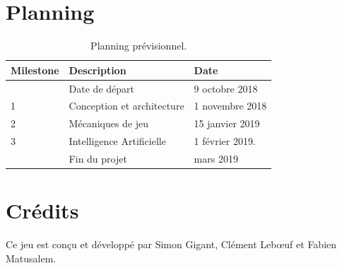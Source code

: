 \documentclass[a4paper]{scrreprt}
\begin{document}


\chapter{Planning}

\begin{table}[h]
\centering
\begin{tabular}{|l|l|l|}
\hline
Milestone & Description & Date \\\hline
& Date de départ & 9 octobre 2018 \\
1 & Conception et architecture  & 1 novembre 2018 \\
2 & Mécaniques de jeu & 15 janvier 2019\\
3 & Intelligence Artificielle & 1 février 2019. \\
& Fin du projet & mars 2019 \\
\hline
\end{tabular}
\caption{\label{tab:schedule}Planning prévisionnel.}
\end{table}




\chapter{Crédits}

Ce jeu est conçu et développé par Simon Gigant, Clément Leb\oe uf et Fabien Matusalem.


%
%
\end{document}
